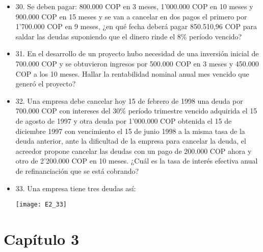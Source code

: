 \begin{itemize}
 \item 30. Se deben pagar: 800.000 COP en 3 meses, 1'000.000 COP en 10 meses y 900.000 COP en 15 meses y se van a cancelar en dos pagos el primero por 1'700.000 COP en 9 meses,  ¿en qué fecha deberá pagar 850.510,96 COP para saldar las deudas suponiendo que el dinero rinde el 8\% período vencido?
       \medskip

 \item 31. En el desarrollo de un proyecto hubo necesidad de una inversión inicial de 700.000 COP y se obtuvieron ingresos por 500.000 COP en 3 meses y 450.000 COP a los 10 meses. Hallar la rentabilidad nominal anual mes vencido que generó el proyecto?\\
       \medskip

 \item 32. Una empresa debe cancelar hoy 15 de febrero de 1998 una deuda por 700.000 COP con intereses del 30\% período trimestre vencido adquirida el 15 de agosto de 1997 y otra deuda por 1'000.000 COP obtenida el 15 de diciembre 1997 con vencimiento el 15 de junio 1998 a la misma tasa de la deuda anterior, ante la dificultad de la empresa para cancelar la deuda, el acreedor propone cancelar las deudas con un pago de 200.000 COP ahora y otro de 2'200.000 COP en 10 meses. ¿Cuál es la tasa de interés efectiva anual de refinanciación que se está cobrando?\\
       \medskip

 \item 33. Una empresa tiene tres deudas así:
       \begin{center}
        \texttt{[image: E2\_33]}
       \end{center}

\end{itemize}
\newpage


\chapter*{Capítulo 3}



